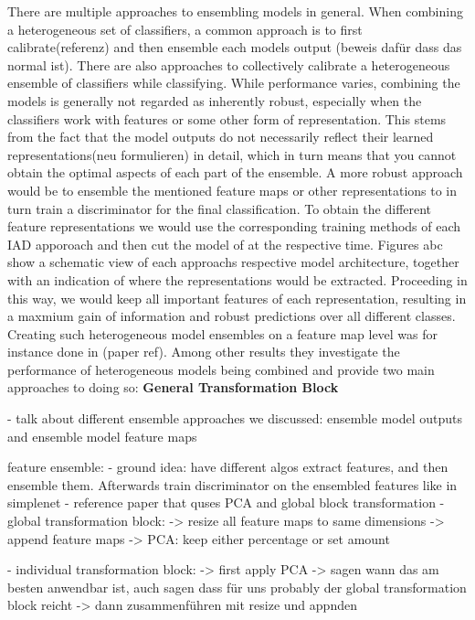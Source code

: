 There are multiple approaches to ensembling models in general. When combining a heterogeneous set of classifiers, a common approach is to first calibrate(referenz) and then ensemble each models 
output (beweis dafür dass das normal ist). There are also approaches to collectively calibrate a heterogeneous ensemble of classifiers while classifying. While performance varies, combining 
the models is generally not regarded as inherently robust, especially when the classifiers work with features or some other form of representation. This stems from the fact that the model outputs 
do not necessarily reflect their learned representations(neu formulieren) in detail, which in turn means that you cannot obtain the optimal aspects of each part of the ensemble. A more robust 
approach would be to ensemble the mentioned feature maps or other representations to in turn train a discriminator for the final classification. To obtain the different feature representations 
we would use the corresponding training methods of each IAD apporoach and then cut the model of at the respective time. Figures abc show a schematic view of each approachs respective model 
architecture, together with an indication of where the representations would be extracted. Proceeding in this way, we would keep all important features of each representation, resulting in a 
maxmium gain of information and robust predictions over all different classes.
Creating such heterogeneous model ensembles on a feature map level was for instance done in (paper ref). Among other results they investigate the performance of heterogeneous models being 
combined and provide two main approaches to doing so:
\textbf{General Transformation Block}




- talk about different ensemble approaches we discussed: ensemble model outputs and ensemble model feature maps

feature ensemble:
- ground idea: have different algos extract features, and then ensemble them. Afterwards train discriminator on the ensembled features like in simplenet
- reference paper that quses PCA and global block transformation
- global transformation block:
-> resize all feature maps to same dimensions
-> append feature maps
-> PCA: keep either percentage or set amount

- individual transformation block:
-> first apply PCA
-> sagen wann das am besten anwendbar ist, auch sagen dass für uns probably der global transformation block reicht
-> dann zusammenführen mit resize und appnden


